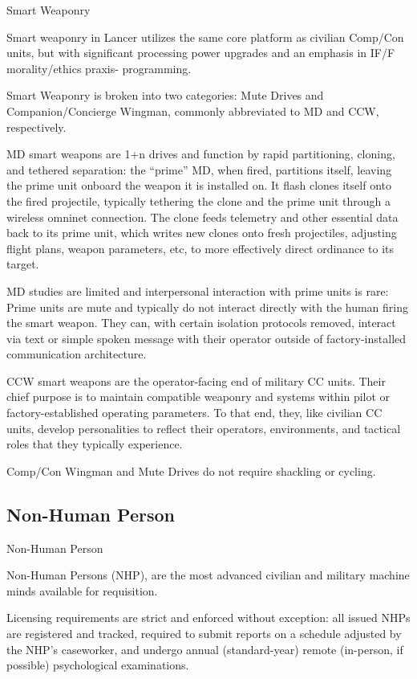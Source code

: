 Smart Weaponry

Smart weaponry in Lancer utilizes the same core platform as civilian Comp/Con units, but with
significant processing power upgrades and an emphasis in IF/F morality/ethics praxis-
programming.


Smart Weaponry is broken into two categories: Mute Drives and Companion/Concierge
Wingman, commonly abbreviated to MD and CCW, respectively.


MD smart weapons are 1+n drives and function by rapid partitioning, cloning, and tethered
separation: the “prime” MD, when fired, partitions itself, leaving the prime unit onboard the
weapon it is installed on. It flash clones itself onto the fired projectile, typically tethering the clone
and the prime unit through a wireless omninet connection. The clone feeds telemetry and other
essential data back to its prime unit, which writes new clones onto fresh projectiles, adjusting
flight plans, weapon parameters, etc, to more effectively direct ordinance to its target.


MD studies are limited and interpersonal interaction with prime units is rare: Prime units are mute
and typically do not interact directly with the human firing the smart weapon. They can, with
certain isolation protocols removed, interact via text or simple spoken message with their
operator outside of factory-installed communication architecture.


CCW smart weapons are the operator-facing end of military CC units. Their chief purpose is to
maintain compatible weaponry and systems within pilot or factory-established operating
parameters. To that end, they, like civilian CC units, develop personalities to reflect their
operators, environments, and tactical roles that they typically experience.


Comp/Con Wingman and Mute Drives do not require shackling or cycling.

\subsection{Non-Human Person}
Non-Human Person

Non-Human Persons (NHP), are the most advanced civilian and military machine minds available
for requisition.


Licensing requirements are strict and enforced without exception: all issued NHPs are registered
and tracked, required to submit reports on a schedule adjusted by the NHP’s caseworker, and
undergo annual (standard-year) remote (in-person, if possible) psychological examinations.


